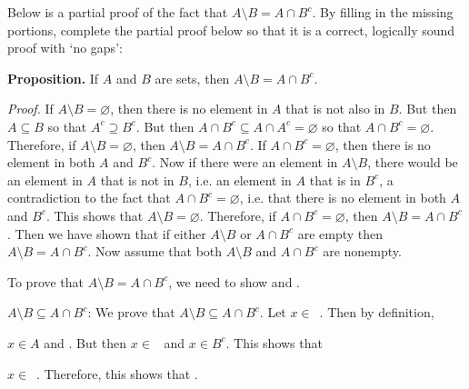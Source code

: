 \documentclass[11pt,letterpaper]{article}
\begin{document}
\newpage



 Below is a partial proof of the fact that $A \setminus B= A \cap B^c$. By filling in the missing portions, complete the partial proof below so that it is a correct, logically sound proof with `no gaps': \pspace

{\bfseries Proposition.} If $A$ and $B$ are sets, then $A \setminus B= A \cap B^c$. \pspace

{\itshape Proof.} If $A \setminus B= \varnothing$, then there is no element in $A$ that is not also in $B$. But then $A \subseteq B$ so that $A^c \supseteq B^c$. But then $A \cap B^c \subseteq A \cap A^c= \varnothing$ so that $A \cap B^c= \varnothing$. Therefore, if $A \setminus B= \varnothing$, then $A \setminus B= A \cap B^c$. If $A \cap B^c= \varnothing$, then there is no element in both $A$ and $B^c$. Now if there were an element in $A \setminus B$, there would be an element in $A$ that is not in $B$, i.e. an element in $A$ that is in $B^c$, a contradiction to the fact that $A \cap B^c= \varnothing$, i.e. that there is no element in both $A$ and $B^c$. This shows that $A \setminus B= \varnothing$. Therefore, if $A \cap B^c= \varnothing$, then $A \setminus B= A \cap B^c$. Then we have shown that if either $A \setminus B$ or $A \cap B^c$ are empty then $A \setminus B= A \cap B^c$. Now assume that both $A \setminus B$ and $A \cap B^c$ are nonempty. \pspace

To prove that $A \setminus B= A \cap B^c$, we need to show \underline{\hspace{3cm}} and \underline{\hspace{3cm}}. \par\vspace{3\baselineskip}

$A \setminus B \subseteq A \cap B^c$: We prove that $A \setminus B \subseteq A \cap B^c$. Let $x \in$~\underline{\hspace{3cm}}. Then by definition, \pspace

$x \in A$ and \underline{\hspace{3cm}}. But then $x \in$~\underline{\hspace{3cm}} and $x \in B^c$. This shows that \pspace

$x \in$~\underline{\hspace{3cm}}. Therefore, this shows that \underline{\hspace{3cm}}. \par\vspace{3\baselineskip}
\end{document}
